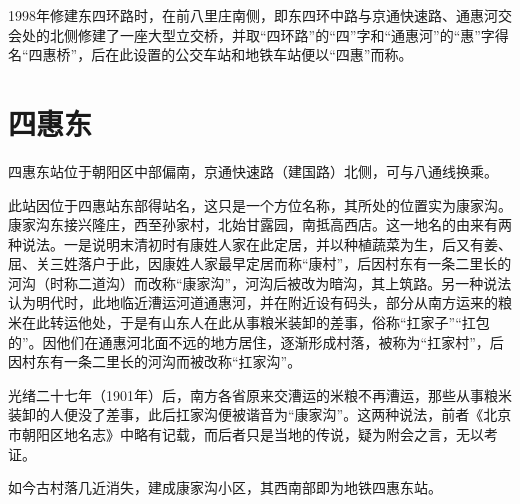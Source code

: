 1998年修建东四环路时，在前八里庄南侧，即东四环中路与京通快速路、通惠河交会处的北侧修建了一座大型立交桥，并取“四环路”的“四”字和“通惠河”的“惠”字得名“四惠桥”，后在此设置的公交车站和地铁车站便以“四惠”而称。

\section{四惠东}
四惠东站位于朝阳区中部偏南，京通快速路（建国路）北侧，可与八通线换乘。

此站因位于四惠站东部得站名，这只是一个方位名称，其所处的位置实为康家沟。康家沟东接兴隆庄，西至孙家村，北始甘露园，南抵高西店。这一地名的由来有两种说法。一是说明末清初时有康姓人家在此定居，并以种植蔬菜为生，后又有姜、屈、关三姓落户于此，因康姓人家最早定居而称“康村”，后因村东有一条二里长的河沟（时称二道沟）而改称“康家沟”，河沟后被改为暗沟，其上筑路。另一种说法认为明代时，此地临近漕运河道通惠河，并在附近设有码头，部分从南方运来的粮米在此转运他处，于是有山东人在此从事粮米装卸的差事，俗称“扛家子”“扛包的”。因他们在通惠河北面不远的地方居住，逐渐形成村落，被称为“扛家村”，后因村东有一条二里长的河沟而被改称“扛家沟”。

光绪二十七年（1901年）后，南方各省原来交漕运的米粮不再漕运，那些从事粮米装卸的人便没了差事，此后扛家沟便被谐音为“康家沟”。这两种说法，前者《北京市朝阳区地名志》中略有记载，而后者只是当地的传说，疑为附会之言，无以考证。

如今古村落几近消失，建成康家沟小区，其西南部即为地铁四惠东站。
